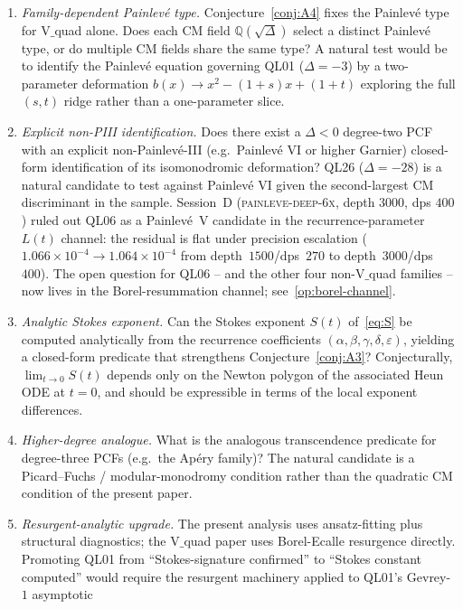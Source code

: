 \documentclass[12pt]{amsart}
\theoremstyle{definition}
\begin{document}
\begin{enumerate}
\item \emph{Family-dependent Painlev\'e type.}\label{op:family-painleve}
Conjecture~\ref{conj:A4}
fixes the Painlev\'e type for V$\_$quad alone. Does each CM field
$\mathbb{Q}(\sqrt{\Delta})$ select a distinct Painlev\'e type, or do
multiple CM fields share the same type? A natural test would be to
identify the Painlev\'e equation governing QL01 ($\Delta=-3$) by a
two-parameter deformation $b(x)\to x^{2}-(1+s)x+(1+t)$ exploring the
full $(s,t)$ ridge rather than a one-parameter slice.
\item \emph{Explicit non-PIII identification.}\label{op:non-piii} Does there exist a
$\Delta<0$ degree-two PCF with an explicit non-Painlev\'e-III (e.g.\
Painlev\'e VI or higher Garnier) closed-form identification of its
isomonodromic deformation? QL26 ($\Delta=-28$) is a natural candidate
to test against Painlev\'e VI given the second-largest CM discriminant
in the sample. Session~D
(\textsc{painleve-deep-6x}, depth $3000$, dps $400$) ruled out QL06
as a Painlev\'e~V candidate in the recurrence-parameter $L(t)$ channel:
the residual is flat under precision escalation
($1.066\times 10^{-4}\to 1.064\times 10^{-4}$ from
depth~$1500$/dps~$270$ to depth~$3000$/dps~$400$). The open question
for QL06 -- and the other four non-V$\_$quad families -- now lives in
the Borel-resummation channel; see~\ref{op:borel-channel}.
\item \emph{Analytic Stokes exponent.} Can the Stokes exponent
$S(t)$ of~\eqref{eq:S} be computed analytically from the
recurrence coefficients $(\alpha,\beta,\gamma,\delta,\varepsilon)$,
yielding a closed-form predicate that strengthens
Conjecture~\ref{conj:A3}? Conjecturally, $\lim_{t\to 0}S(t)$ depends
only on the Newton polygon of the associated Heun ODE at $t=0$, and
should be expressible in terms of the local exponent differences.
\item \emph{Higher-degree analogue.} What is the analogous transcendence
predicate for degree-three PCFs (e.g.\ the Ap\'ery family)? The natural
candidate is a Picard--Fuchs / modular-monodromy condition rather than
the quadratic CM condition of the present paper.
\item \emph{Resurgent-analytic upgrade.} The present analysis uses
ansatz-fitting plus structural diagnostics; the V$\_$quad paper
uses Borel-Ecalle resurgence directly. Promoting QL01 from
``Stokes-signature confirmed'' to ``Stokes constant computed'' would
require the resurgent machinery applied to QL01's Gevrey-$1$ asymptotic

\end{enumerate}
\end{document}
